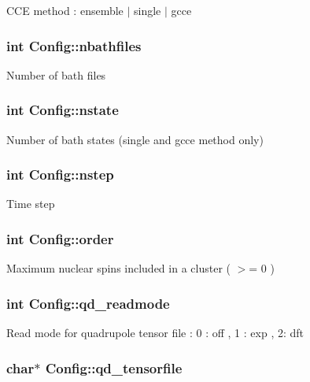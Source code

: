 C\-C\-E method \-: ensemble $|$ single $|$ gcce \hypertarget{structConfig_a26827d7c075042372d21965a827328c3}{
\subsubsection[{nbathfiles}]{\setlength{\rightskip}{0pt plus 5cm}int Config\-::nbathfiles}}\label{structConfig_a26827d7c075042372d21965a827328c3}
Number of bath files \hypertarget{structConfig_a91b2aadf805896022127036ded259e79}{
\subsubsection[{nstate}]{\setlength{\rightskip}{0pt plus 5cm}int Config\-::nstate}}\label{structConfig_a91b2aadf805896022127036ded259e79}
Number of bath states (single and gcce method only) \hypertarget{structConfig_acd1675410784e93a9c9866de0c64807e}{
\subsubsection[{nstep}]{\setlength{\rightskip}{0pt plus 5cm}int Config\-::nstep}}\label{structConfig_acd1675410784e93a9c9866de0c64807e}
Time step \hypertarget{structConfig_a3a9071ea9a9409cefb8cbcea2184c879}{
\subsubsection[{order}]{\setlength{\rightskip}{0pt plus 5cm}int Config\-::order}}\label{structConfig_a3a9071ea9a9409cefb8cbcea2184c879}
Maximum nuclear spins included in a cluster ( $>$= 0 ) \hypertarget{structConfig_adc1119b46a95084ddd4c7bfa2a8d50d9}{
\subsubsection[{qd\-\_\-readmode}]{\setlength{\rightskip}{0pt plus 5cm}int Config\-::qd\-\_\-readmode}}\label{structConfig_adc1119b46a95084ddd4c7bfa2a8d50d9}
Read mode for quadrupole tensor file \-: 0 \-: off , 1 \-: exp , 2\-: dft \hypertarget{structConfig_a91d5741035098807bc28000a003bd35d}{
\subsubsection[{qd\-\_\-tensorfile}]{\setlength{\rightskip}{0pt plus 5cm}char$\ast$ Config\-::qd\-\_\-tensorfile}}\label{structConfig_a91d5741035098807bc28000a003bd35d}
